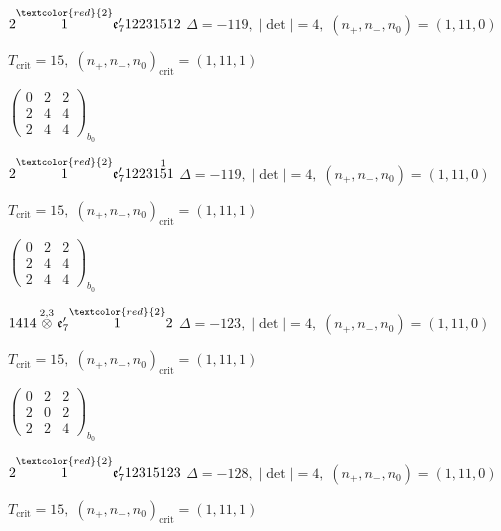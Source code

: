 \documentclass[10pt]{article}
\begin{document}
$2\overset{\textcolor{red}{2}}{1}\mathfrak{e}_7'12231512$ \quad $\Delta=-119,\; |\det|=4,\; (n_+,n_-,n_0)=(1,11,0)$

\hspace{1em}$T_{\text{crit}}=15,\; (n_+,n_-,n_0)_{\text{crit}}=(1,11,1)$

\hspace{2em}$\left(\begin{smallmatrix}0 & 2 & 2 \\ 2 & 4 & 4 \\ 2 & 4 & 4\end{smallmatrix}\right)_{\!b_0}$

\smallskip

$2\overset{\textcolor{red}{2}}{1}\mathfrak{e}_7'12231\overset{1}{5}1$ \quad $\Delta=-119,\; |\det|=4,\; (n_+,n_-,n_0)=(1,11,0)$

\hspace{1em}$T_{\text{crit}}=15,\; (n_+,n_-,n_0)_{\text{crit}}=(1,11,1)$

\hspace{2em}$\left(\begin{smallmatrix}0 & 2 & 2 \\ 2 & 4 & 4 \\ 2 & 4 & 4\end{smallmatrix}\right)_{\!b_0}$

\smallskip

$1414\overset{2,3}{\otimes}\mathfrak{e}_7'\overset{\textcolor{red}{2}}{1}2$ \quad $\Delta=-123,\; |\det|=4,\; (n_+,n_-,n_0)=(1,11,0)$

\hspace{1em}$T_{\text{crit}}=15,\; (n_+,n_-,n_0)_{\text{crit}}=(1,11,1)$

\hspace{2em}$\left(\begin{smallmatrix}0 & 2 & 2 \\ 2 & 0 & 2 \\ 2 & 2 & 4\end{smallmatrix}\right)_{\!b_0}$

\smallskip

$2\overset{\textcolor{red}{2}}{1}\mathfrak{e}_7'12315123$ \quad $\Delta=-128,\; |\det|=4,\; (n_+,n_-,n_0)=(1,11,0)$

\hspace{1em}$T_{\text{crit}}=15,\; (n_+,n_-,n_0)_{\text{crit}}=(1,11,1)$
\end{document}
